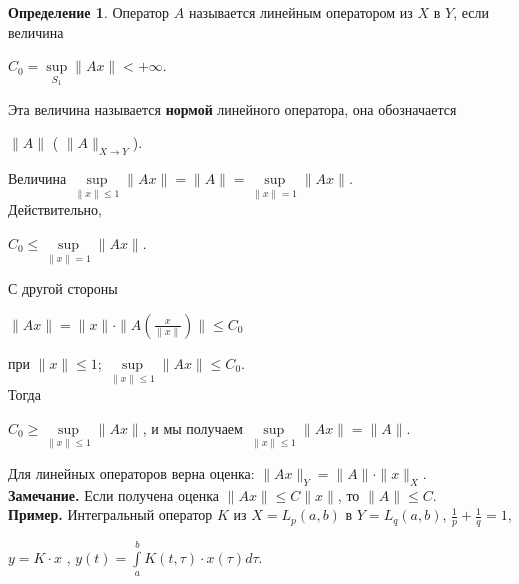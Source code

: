 \documentclass[12pt,a4paper,titlepage]{book}
\theoremstyle{definition}
\newtheorem*{definition}{Определение}
\theoremstyle{plain}
\theoremstyle{remark}
\theoremstyle{remark}
\theoremstyle{remark}
\theoremstyle{plain}
\begin{document}
\begin{definition} Оператор $A$ называется линейным оператором из $X$ в $Y$, если величина 
\begin{center}
$ C_0=\underset{S_1}{\sup}\parallel Ax \parallel<+\infty $.
\end{center}
\end{definition}

Эта величина называется \textbf{нормой} линейного оператора, она обозначается
\begin{center}
$\parallel A \parallel$ 
( $\parallel A \parallel _{X \rightarrow Y}$).
\end{center}

Величина $\underset{\parallel x\parallel \leq1}{\sup}\parallel Ax \parallel =
\parallel A \parallel =
\underset{\parallel x\parallel=1}{\sup}\parallel Ax \parallel$.\\

Действительно,
\begin{center}
$C_0\leq 
\underset{\parallel x\parallel=1}{\sup}\parallel Ax \parallel$.
\end{center}

С другой стороны 
\begin{center}
$\parallel Ax \parallel=
\parallel x \parallel \cdot \parallel A(\frac{x}{\parallel x \parallel}) \parallel \leq C_0$
\end{center} 
при $\parallel x \parallel \leq 1$; 
$\underset{\parallel x\parallel \leq 1}{\sup}\parallel Ax \parallel \leq C_0$.\\

Тогда 
\begin{center}
$ C_0 \geq\underset{\parallel x\parallel \leq 1}{\sup}\parallel Ax \parallel $, и мы получаем 
$\underset{\parallel x\parallel \leq 1}{\sup}\parallel Ax \parallel =\parallel A \parallel$.
\end{center}

Для линейных операторов верна оценка: $\parallel Ax \parallel _{Y} =\parallel A \parallel \cdot \parallel x \parallel_{X} $.\\

\textbf{Замечание.} Если получена оценка  $\parallel Ax \parallel \leq {C}  \parallel x \parallel$, то $\parallel A \parallel \leq {C} $.\\

\textbf{Пример.} Интегральный оператор $K$ из $X=L_p(a,b)$ в $Y=L_q(a,b)$, $
\frac{1}{p}+\frac{1}{q}=1$,
\begin{center}
$y=K\cdot x$ ,  $ y(t)=\int\limits_a^b K(t,\tau)\cdot x(\tau)d\tau$.
\end{center}
\end{document}
